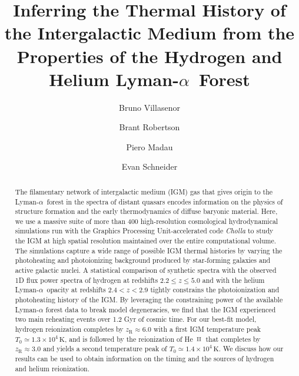 \documentclass[twocolumn]{aastex62}
\newcommand\Lya{Lyman-$\alpha$}
\def\HeII{\hbox{He~$\scriptstyle\rm II$}}
\begin{document}
\title{Inferring the Thermal History of the Intergalactic Medium from the 
Properties of the Hydrogen and Helium \Lya\ Forest}


\author[0000-0002-7460-8129]{Bruno Villasenor}

\author[0000-0002-4271-0364]{Brant Robertson}

\author[0000-0002-6336-3293]{Piero Madau}

\author[0000-0001-9735-7484]{Evan Schneider}

\begin{abstract}
The filamentary network of intergalactic medium (IGM) gas that gives origin to the  \Lya\ forest in the spectra of distant quasars encodes information 
on the physics of structure formation
and the early thermodynamics of 
diffuse baryonic material. Here, we use a massive suite of more than 400 high-resolution cosmological hydrodynamical simulations run with the Graphics Processing Unit-accelerated code {\it Cholla} to study the IGM at 
high spatial resolution maintained over the entire computational volume.
The simulations capture a wide range of possible IGM thermal histories
by varying the photoheating and photoionizing background
produced by star-forming galaxies and active galactic nuclei.
A statistical comparison of synthetic spectra with the observed 1D flux power spectra of hydrogen at redshifts  $2.2\leq z\leq 5.0$
and with the helium \Lya\ opacity at redshifts $2.4<z<2.9$ tightly constrains the photoionization and photoheating history of the IGM.
By leveraging the constraining power of the available \Lya{} forest data to break model
degeneracies, we find
that the IGM experienced two main reheating events over 1.2 Gyr of 
cosmic time.
For our best-fit model, hydrogen reionization completes by $z_\mathrm{R} \approx 6.0$
with a first IGM temperature peak $T_0 \simeq 1.3 \times 10^4 \, \mathrm{K}$, and is 
followed by the reionization of \HeII\ that completes 
by $z_\mathrm{R} \approx 3.0$ and 
yields a second temperature peak of $T_0 \simeq 1.4 \times 10^4 \, \mathrm{K}$.
We discuss how our results can be used  to obtain information on the timing and the sources of hydrogen and helium reionization.
\end{abstract}
\end{document}
